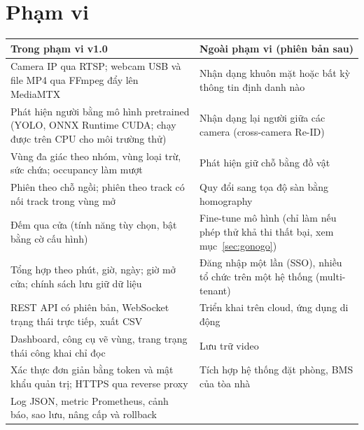 \documentclass[10pt,a4paper,oneside,openany]{report}
\newcommand{\tabhead}[1]{\textsf{\bfseries\color{ink}#1}}
\newenvironment{bang}{\par\small\rowcolors{2}{rowgray}{white}}{\par\vspace{0.3em}}
\begin{document}
\section{Phạm vi}
\begin{bang}
\begin{tabularx}{\linewidth}{Y Y}
\toprule
\tabhead{Trong phạm vi v1.0} & \tabhead{Ngoài phạm vi (phiên bản sau)} \\
\midrule
Camera IP qua RTSP; webcam USB và file MP4 qua FFmpeg đẩy lên MediaMTX & Nhận dạng khuôn mặt hoặc bất kỳ thông tin định danh nào \\
Phát hiện người bằng mô hình pretrained (YOLO, ONNX Runtime CUDA; chạy được trên CPU cho môi trường thử) & Nhận dạng lại người giữa các camera (cross-camera Re-ID) \\
Vùng đa giác theo nhóm, vùng loại trừ, sức chứa; occupancy làm mượt & Phát hiện giữ chỗ bằng đồ vật \\
Phiên theo chỗ ngồi; phiên theo track có nối track trong vùng mở & Quy đổi sang tọa độ sàn bằng homography \\
Đếm qua cửa (tính năng tùy chọn, bật bằng cờ cấu hình) & Fine-tune mô hình (chỉ làm nếu phép thử khả thi thất bại, xem mục~\ref{sec:gonogo}) \\
Tổng hợp theo phút, giờ, ngày; giờ mở cửa; chính sách lưu giữ dữ liệu & Đăng nhập một lần (SSO), nhiều tổ chức trên một hệ thống (multi-tenant) \\
REST API có phiên bản, WebSocket trạng thái trực tiếp, xuất CSV & Triển khai trên cloud, ứng dụng di động \\
Dashboard, công cụ vẽ vùng, trang trạng thái công khai chỉ đọc & Lưu trữ video \\
Xác thực đơn giản bằng token và mật khẩu quản trị; HTTPS qua reverse proxy & Tích hợp hệ thống đặt phòng, BMS của tòa nhà \\
Log JSON, metric Prometheus, cảnh báo, sao lưu, nâng cấp và rollback & \\
\bottomrule
\end{tabularx}
\end{bang}
\end{document}
